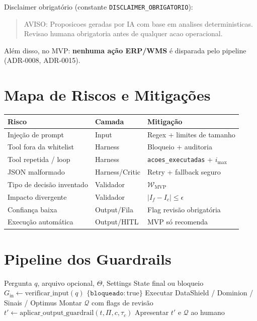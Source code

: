 \documentclass[a4paper, 12pt]{report}
\theoremstyle{definition}
\theoremstyle{remark}
\newcommand{\fila}{\mathcal{Q}}
\begin{document}
\begin{caixaguardrail}
  Disclaimer obrigat\'orio (constante \texttt{DISCLAIMER\_OBRIGATORIO}):
  \begin{quote}
    AVISO: Proposicoes geradas por IA com base em analises
    deterministicas. Revisao humana obrigatoria antes de qualquer
    acao operacional.
  \end{quote}
  Al\'em disso, no MVP: \textbf{nenhuma a\c{c}\~ao ERP/WMS} \'e disparada
  pelo pipeline (ADR-0008, ADR-0015).
\end{caixaguardrail}


\section{Mapa de Riscos e Mitiga\c{c}\~oes}

\begin{center}
\begin{tabular}{lll}
  \toprule
  \textbf{Risco} & \textbf{Camada} & \textbf{Mitiga\c{c}\~ao} \\
  \midrule
  Inje\c{c}\~ao de prompt & Input & Regex + limites de tamanho \\
  Tool fora da whitelist & Harness & Bloqueio + auditoria \\
  Tool repetida / loop & Harness & \texttt{acoes\_executadas} + $i_{\max}$ \\
  JSON malformado & Harness/Critic & Retry + fallback seguro \\
  Tipo de decis\~ao inventado & Validador & $\mathcal{W}_{\text{MVP}}$ \\
  Impacto divergente & Validador & $|I_f - I_c| \leq \epsilon$ \\
  Confian\c{c}a baixa & Output/Fila & Flag revis\~ao obrigat\'oria \\
  Execu\c{c}\~ao autom\'atica & Output/HITL & MVP s\'o recomenda \\
  \bottomrule
\end{tabular}
\end{center}


\section{Pipeline dos Guardrails}

\begin{algorithm}[H]
\caption{Guardrails em Tr\^es Camadas}
\begin{algorithmic}[1]
  \Require Pergunta $q$, arquivo opcional, $\Theta$, Settings
  \Ensure State final ou bloqueio
  \State $G_{\text{in}} \gets \text{verificar\_input}(q)$
    \State \Return $\{\texttt{bloqueado}: \text{true}\}$
  \EndIf
  \State Executar DataShield / Dominion / Sinais / Optimus
  \State {}
  \State Montar $\fila$ com flags de revis\~ao
  \State $t' \gets \text{aplicar\_output\_guardrail}(t, \Pi, c, \tau_c)$
  \State Apresentar $t'$ e $\fila$ ao humano
  \State {}
\end{algorithmic}
\end{algorithm}
\end{document}
